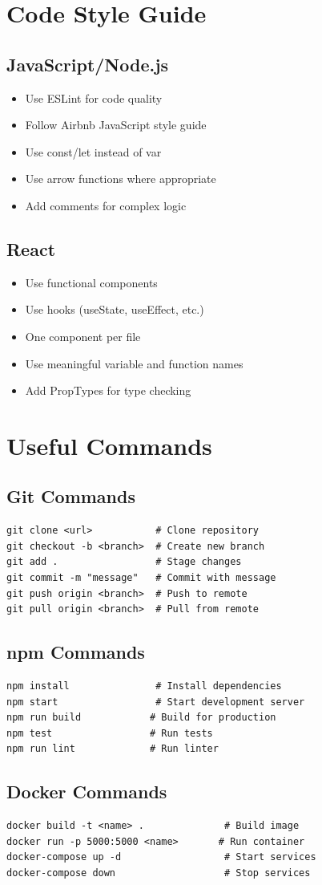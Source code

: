 \section{Code Style Guide}

\subsection{JavaScript/Node.js}
\begin{itemize}
    \item Use ESLint for code quality
    \item Follow Airbnb JavaScript style guide
    \item Use const/let instead of var
    \item Use arrow functions where appropriate
    \item Add comments for complex logic
\end{itemize}

\subsection{React}
\begin{itemize}
    \item Use functional components
    \item Use hooks (useState, useEffect, etc.)
    \item One component per file
    \item Use meaningful variable and function names
    \item Add PropTypes for type checking
\end{itemize}

\section{Useful Commands}

\subsection{Git Commands}
\begin{verbatim}
git clone <url>           # Clone repository
git checkout -b <branch>  # Create new branch
git add .                 # Stage changes
git commit -m "message"   # Commit with message
git push origin <branch>  # Push to remote
git pull origin <branch>  # Pull from remote
\end{verbatim}

\subsection{npm Commands}
\begin{verbatim}
npm install               # Install dependencies
npm start                 # Start development server
npm run build            # Build for production
npm test                 # Run tests
npm run lint             # Run linter
\end{verbatim}

\subsection{Docker Commands}
\begin{verbatim}
docker build -t <name> .              # Build image
docker run -p 5000:5000 <name>       # Run container
docker-compose up -d                  # Start services
docker-compose down                   # Stop services
\end{verbatim}

